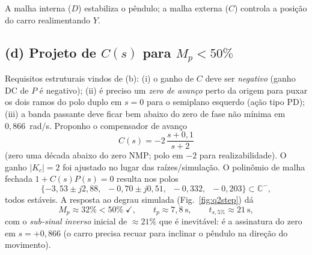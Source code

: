 \documentclass[11pt,a4paper]{article}
\begin{document}
\begin{center}
\end{center}

A malha interna ($D$) estabiliza o p\^endulo; a malha externa ($C$) controla a
posi\c{c}\~ao do carro realimentando $Y$.

\subsection*{(d) Projeto de $C(s)$ para $M_p<50\%$}

Requisitos estruturais vindos de (b): (i) o ganho de $C$ deve ser
\emph{negativo} (ganho DC de $P$ \'e negativo); (ii) \'e preciso um \emph{zero de
avan\c{c}o} perto da origem para puxar os dois ramos do polo duplo em $s=0$ para o
semiplano esquerdo (a\c{c}\~ao tipo PD); (iii) a banda passante deve ficar bem abaixo
do zero de fase n\~ao m\'inima em $0{,}866$~rad/s. Proponho o compensador de avan\c{c}o
\[
\boxed{\;C(s)=-2\,\frac{s+0{,}1}{s+2}\;}
\]
(zero uma d\'ecada abaixo do zero NMP; polo em $-2$ para realizabilidade). O ganho
$|K_c|=2$ foi ajustado no lugar das ra\'izes/simula\c{c}\~ao. O polin\^omio de malha
fechada $1+C(s)P(s)=0$ resulta nos polos
\[
\{-3{,}53\pm j2{,}88,\;\; -0{,}70\pm j0{,}51,\;\; -0{,}332,\;\; -0{,}203\}\subset\mathbb{C}^-,
\]
todos est\'aveis. A resposta ao degrau simulada (Fig.~\ref{fig:q2step}) d\'a
\[
M_p\approx32\%<50\%\;\checkmark,\qquad t_p\approx7{,}8\ \mathrm{s},\qquad
t_{s,5\%}\approx21\ \mathrm{s},
\]
com o \emph{sub-sinal inverso} inicial de ${\approx}21\%$ que \'e inevit\'avel: \'e a
assinatura do zero em $s=+0{,}866$ (o carro precisa recuar para inclinar o p\^endulo
na dire\c{c}\~ao do movimento).
\end{document}
